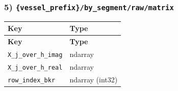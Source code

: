 \documentclass[11pt]{article}
\begin{document}
\subsubsection*{5) \texttt{\{vessel\_\allowbreak{}prefix\}/\allowbreak{}by\_\allowbreak{}segment/\allowbreak{}raw/\allowbreak{}matrix}}
\begin{longtable}{|p{}|p{}|}
\hline
\textbf{Key} & \textbf{Type} \\ \hline
\endfirsthead
\hline
\textbf{Key} & \textbf{Type} \\ \hline
\endhead
\texttt{X\_\allowbreak{}j\_\allowbreak{}over\_\allowbreak{}h\_\allowbreak{}imag} & ndarray \\ \hline
\texttt{X\_\allowbreak{}j\_\allowbreak{}over\_\allowbreak{}h\_\allowbreak{}real} & ndarray \\ \hline
\texttt{row\_\allowbreak{}index\_\allowbreak{}bkr} & ndarray (int32) \\ \hline
\end{longtable}
\end{document}
